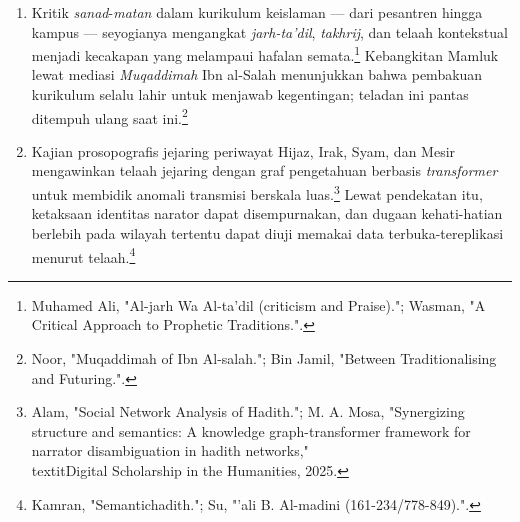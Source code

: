 \begin{enumerate}[leftmargin=1.27cm,itemsep=2pt,parsep=2pt]
\item Kritik \textit{sanad}-\textit{matan} dalam kurikulum keislaman --- dari pesantren hingga kampus --- seyogianya mengangkat \textit{jarh-ta'dil}, \textit{takhrij}, dan telaah kontekstual menjadi kecakapan yang melampaui hafalan semata.\footnote{Muhamed Ali, "Al-jarh Wa Al-ta'dil (criticism and Praise)."; Wasman, "A Critical Approach to Prophetic Traditions.".} Kebangkitan Mamluk lewat mediasi \textit{Muqaddimah} Ibn al-Salah menunjukkan bahwa pembakuan kurikulum selalu lahir untuk menjawab kegentingan; teladan ini pantas ditempuh ulang saat ini.\footnote{Noor, "Muqaddimah of Ibn Al-salah."; Bin Jamil, "Between Traditionalising and Futuring.".}

\item Kajian prosopografis jejaring periwayat Hijaz, Irak, Syam, dan Mesir mengawinkan telaah jejaring dengan graf pengetahuan berbasis \textit{transformer} untuk membidik anomali transmisi berskala luas.\footnote{Alam, "Social Network Analysis of Hadith."; M. A. Mosa, "Synergizing structure and semantics: A knowledge graph-transformer framework for narrator disambiguation in hadith networks," \\textit{Digital Scholarship in the Humanities}, 2025.} Lewat pendekatan itu, ketaksaan identitas narator dapat disempurnakan, dan dugaan kehati-hatian berlebih pada wilayah tertentu dapat diuji memakai data terbuka-tereplikasi menurut telaah.\footnote{Kamran, "Semantichadith."; Su, "'ali B. Al-madini (161-234/778-849).".}

\end{enumerate}
